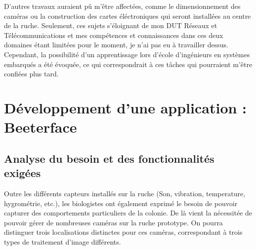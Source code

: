 \documentclass[11pt,french,a4paper]{report}
\begin{document}
D'autres travaux auraient pû m'être affectées, comme le dimensionnement des caméras ou la construction des cartes éléctroniques
qui seront installées au centre de la ruche. Seulement, ces sujets s'éloignant de mon DUT Réseaux et Télécommunications et mes 
compétences et connaissances dans ces deux domaines étant limitées pour le moment, je n'ai pas eu à travailler dessus.\\
Cependant, la possibilité d'un apprentissage lors d'école d'ingénieurs en systèmes embarqués a été évoquée, ce qui correspondrait 
à ces tâches qui pourraient m'être confiées plus tard.


\chapter{Développement d'une application : Beeterface}
    \section{Analyse du besoin et des fonctionnalités exigées}
Outre les différents capteurs installés sur la ruche (Son, vibration, temperature, hygrométrie, etc.), 
les biologistes ont également exprimé le besoin de pouvoir capturer des comportements particuliers de la colonie. 
De là vient la nécessitée de pouvoir gérer de nombreuses caméras sur la ruche prototype. 
On pourra distinguer trois localisations distinctes pour ces caméras, correspondant à trois types de traitement d'image différents. \\
\end{document}
